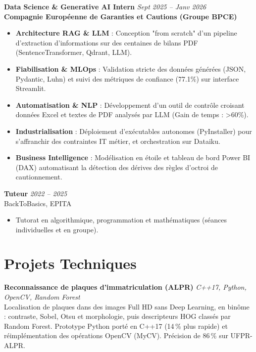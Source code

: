 \documentclass[10pt,a4paper]{article}
\begin{document}
\vspace{0.15cm}

\noindent
\textbf{Data Science \& Generative AI Intern} \hfill \textit{Sept 2025 -- Janv 2026} \\
\textbf{Compagnie Européenne de Garanties et Cautions (Groupe BPCE)}
\begin{itemize}
    \item \textbf{Architecture RAG \& LLM} : Conception "from scratch" d'un pipeline d'extraction d'informations sur des centaines de bilans PDF (SentenceTransformer, Qdrant, LLM).
    \item \textbf{Fiabilisation \& MLOps} : Validation stricte des données générées (JSON, Pydantic, Luhn) et suivi des métriques de confiance (77.1\%) sur interface Streamlit.
    \item \textbf{Automatisation \& NLP} : Développement d'un outil de contrôle croisant données Excel et textes de PDF analysés par LLM (Gain de temps : >60\%).
    \item \textbf{Industrialisation} : Déploiement d'exécutables autonomes (PyInstaller) pour s'affranchir des contraintes IT métier, et orchestration sur Dataiku.
    \item \textbf{Business Intelligence} : Modélisation en étoile et tableau de bord Power BI (DAX) automatisant la détection des dérives des règles d'octroi de cautionnement.
\end{itemize}

\vspace{0.15cm}

\noindent
\textbf{Tuteur} \hfill \textit{2022 -- 2025} \\
BackToBasics, EPITA
\begin{itemize}
    \item Tutorat en algorithmique, programmation et mathématiques (séances individuelles et en groupe).
\end{itemize}

\section*{Projets Techniques}

\noindent
\textbf{Reconnaissance de plaques d'immatriculation (ALPR)} \hfill \textit{C++17, Python, OpenCV, Random Forest} \\
Localisation de plaques dans des images Full HD sans Deep Learning, en binôme : contraste, Sobel, Otsu et morphologie, puis descripteurs HOG classés par Random Forest. Prototype Python porté en C++17 (14\,\% plus rapide) et réimplémentation des opérations OpenCV (MyCV). Précision de 86\,\% sur UFPR-ALPR.
\end{document}
